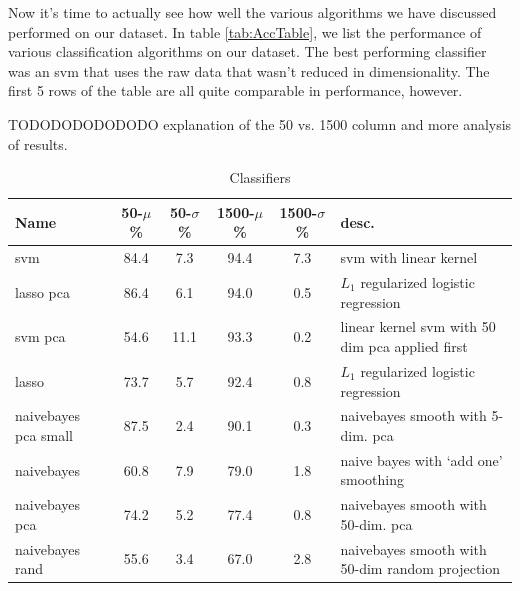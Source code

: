 
%

Now it's time to actually see how well the various algorithms we have discussed performed on our dataset. In table \ref{tab:AccTable}, we list the performance of various classification algorithms on our dataset. The best performing classifier was an svm that uses the raw data that wasn't reduced in dimensionality. The first 5 rows of the table are all quite comparable in performance, however. 

TODODODODODODO explanation of the 50 vs. 1500 column and more analysis of results. 

\begin{center}
\begin{table}
\begin{tabular}{lccccl}
\hline
Name & 50-$\mu$ \% & 50-$\sigma$ \% & 1500-$\mu$ \% & 1500-$\sigma$ \% &  desc.\\
\hline
svm & 84.4 & 7.3 & 94.4 & 7.3 & svm with linear kernel\\
lasso pca &  86.4 & 6.1& 94.0 & 0.5 & $L_1$ regularized logistic regression\\
svm pca &54.6 & 11.1&  93.3 & 0.2 &  linear kernel svm with 50 dim pca applied first\\
lasso & 73.7& 5.7 & 92.4 & 0.8 & $L_1$ regularized logistic regression\\
naivebayes pca small & 87.5& 2.4 & 90.1 & 0.3  & naivebayes smooth with 5-dim. pca\\
naivebayes & 60.8 & 7.9& 79.0 & 1.8& naive bayes with `add one' smoothing\\
naivebayes pca  & 74.2 & 5.2 & 77.4 & 0.8 & naivebayes smooth with 50-dim. pca\\
naivebayes rand & 55.6 & 3.4 & 67.0 & 2.8  & naivebayes smooth with 50-dim random projection\\
\end{tabular}
\caption{Classifiers}
\label{tab:Classifiers}
\par
\end{table}
\end{center}



